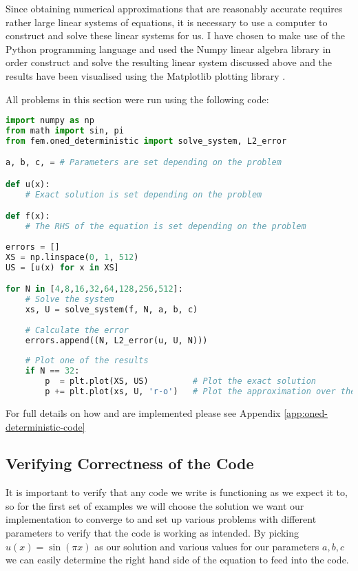 
Since obtaining numerical approximations that are reasonably accurate requires rather large linear systems 
of equations, it is necessary to use a computer to construct and solve these linear systems for us.
I have chosen to make use of the Python programming language and used the Numpy linear algebra library
\cite{numpy-array} in order construct and solve the resulting linear system discussed above
 and the results have been visualised using the Matplotlib plotting library
\cite{matplotlib}.

All problems in this section were run using the following code:

\begin{lstlisting}[language=Python]
import numpy as np
from math import sin, pi
from fem.oned_deterministic import solve_system, L2_error

a, b, c, = # Parameters are set depending on the problem

def u(x):
	# Exact solution is set depending on the problem

def f(x):
	# The RHS of the equation is set depending on the problem
    
errors = []
XS = np.linspace(0, 1, 512)
US = [u(x) for x in XS]

for N in [4,8,16,32,64,128,256,512]:
	# Solve the system
	xs, U = solve_system(f, N, a, b, c)
    
	# Calculate the error
	errors.append((N, L2_error(u, U, N)))
    
	# Plot one of the results
	if N == 32:
		p  = plt.plot(XS, US)         # Plot the exact solution
		p += plt.plot(xs, U, 'r-o')   # Plot the approximation over the top
\end{lstlisting}\label{code:oned-deterministic}

For full details on how  and  are implemented please
see Appendix \ref{app:oned-deterministic-code}

\subsection{Verifying Correctness of the Code}

It is important to verify that any code we write is functioning as we expect it to, so for the first set of examples
we will choose the solution we want our implementation to converge to and set up various problems with different
parameters to verify that the code is working as intended. By picking $u(x) = \sin{(\pi x)}$ as our solution and
various values for our parameters $a,b,c$ we can easily determine the right hand side of the equation to feed into
the code.

